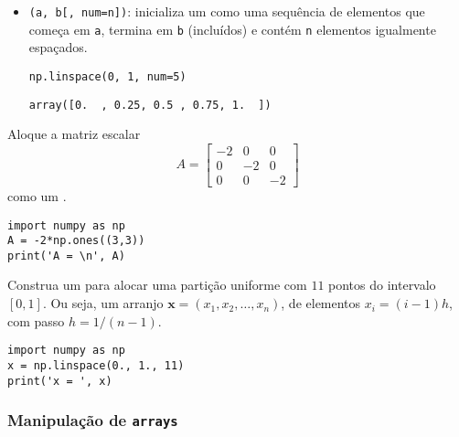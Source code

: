 \begin{itemize}
  \item \hl{\PYTHONnumpyDOTlinspace}\texttt{(a, b[, num=n])}: inicializa um {\PYTHONnumpyDOTarray} como uma sequência de elementos que começa em \texttt{a}, termina em \texttt{b} (incluídos) e contém \texttt{n} elementos igualmente espaçados.

\begin{lstlisting}[framexrightmargin=-2.4em]
np.linspace(0, 1, num=5)
\end{lstlisting}

\begin{verbatim}
array([0.  , 0.25, 0.5 , 0.75, 1.  ])
\end{verbatim}

\end{itemize}

\begin{exer}
  Aloque a matriz escalar
  \begin{equation}
      A = \begin{bmatrix}
        -2 & 0 & 0\\
        0 & -2 & 0\\
        0 & 0 & -2
      \end{bmatrix}
  \end{equation}  
como um {\PYTHONnumpyDOTarray}.
\end{exer}
\begin{resp}
  
\begin{lstlisting}
import numpy as np
A = -2*np.ones((3,3))
print('A = \n', A)
\end{lstlisting}

\end{resp}

\begin{exer}
  Construa um {\PYTHONnumpyDOTarray} para alocar uma partição uniforme com $11$ pontos do intervalo $[0, 1]$. Ou seja, um arranjo $\pmb{x} = (x_1, x_2, \dotsc, x_n)$, de elementos $x_i = (i-1)h$, com passo $h = 1/(n-1)$. 
\end{exer}
\begin{resp}
  
\begin{lstlisting}
import numpy as np
x = np.linspace(0., 1., 11)
print('x = ', x)
\end{lstlisting}

\end{resp}

\subsubsection{Manipulação de \texttt{arrays}}

